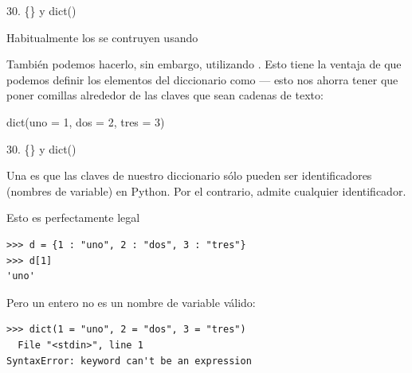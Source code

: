 \documentclass[14pt]{beamer}
\begin{document}
\begin{frame}{30. \{\} y dict()}
  \begin{center}
    \centering
    \small
    Habitualmente los  se contruyen usando \structure{{}}
  \end{center}

  \begin{block}{}
    \Large
  \end{block}

  \vspace{0.5cm}

  \begin{center}{}
    \centering
    \small
    También podemos hacerlo, sin embargo, utilizando
    . Esto tiene la ventaja de que podemos definir
    los elementos del diccionario como  --- esto nos ahorra tener que poner comillas
    alrededor de las claves que sean cadenas de texto:
  \end{center}

  \begin{block}{}
    \Large
    \centering dict(uno = 1, dos = 2, tres = 3)
  \end{block}
\end{frame}

\begin{frame}[fragile]{30. \{\} y dict()}
  \small
  \begin{block}{}
    \centering
    Una  es que las claves de nuestro
    diccionario sólo pueden ser identificadores (nombres de variable)
     en Python. Por el contrario, \structure{\{\}}
    admite cualquier identificador.
  \end{block}

  \footnotesize
  \begin{exampleblock}
    {Esto es perfectamente legal}
    \begin{lstlisting}
>>> d = {1 : "uno", 2 : "dos", 3 : "tres"}
>>> d[1]
'uno'
    \end{lstlisting}
  \end{exampleblock}

  \begin{exampleblock}
    {Pero un entero no es un nombre de variable válido:}
    \begin{lstlisting}
>>> dict(1 = "uno", 2 = "dos", 3 = "tres")
  File "<stdin>", line 1
SyntaxError: keyword can't be an expression
    \end{lstlisting}
  \end{exampleblock}
\end{frame}
\end{document}
